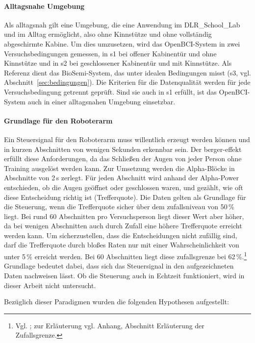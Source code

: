 \paragraph{Alltagsnahe Umgebung} Als alltagsnah gilt eine Umgebung, die eine Anwendung im DLR\_\allowbreak School\_\allowbreak Lab und im Alltag ermöglicht, also ohne Kinnstütze und ohne vollständig abgeschirmte Kabine. Um dies umzusetzen, wird das OpenBCI-System in zwei Versuchsbedingungen gemessen, in s1 bei offener Kabinentür und ohne Kinnstütze und in s2 bei geschlossener Kabinentür und mit Kinnstütze. Als Referenz dient das BioSemi-System, das unter idealen Bedingungen misst (s3, vgl. Abschnitt~\ref{sec:bedingungen}). Die Kriterien für die Datenqualität werden für jede Versuchsbedingung getrennt geprüft. Sind sie auch in s1 erfüllt, ist das OpenBCI-System auch in einer alltagsnahen Umgebung einsetzbar.

\paragraph{Grundlage für den Roboterarm} Ein Steuersignal für den Roboterarm muss willentlich erzeugt werden können und in kurzen Abschnitten von wenigen Sekunden erkennbar sein. Der \gls{berger-effekt} erfüllt diese Anforderungen, da das Schließen der Augen von jeder Person ohne Training ausgelöst werden kann. Zur Umsetzung werden die Alpha-Blöcke in Abschnitte von 2\,s zerlegt. Für jeden Abschnitt wird anhand der Alpha-Power entschieden, ob die Augen geöffnet oder geschlossen waren, und gezählt, wie oft diese Entscheidung richtig ist (Trefferquote). Die Daten gelten als Grundlage für die Steuerung, wenn die Trefferquote sicher über dem \gls{zufallsniveau} von 50\,\% liegt. Bei rund 60 Abschnitten pro Versuchsperson liegt dieser Wert aber höher, da bei wenigen Abschnitten auch durch Zufall eine höhere Trefferquote erreicht werden kann. Um sicherzustellen, dass die Entscheidungen nicht zufällig sind, darf die Trefferquote durch bloßes Raten nur mit einer Wahrscheinlichkeit von unter 5\,\% erreicht werden. Bei 60 Abschnitten liegt diese \gls{zufallsgrenze} bei 62\,\%.\footnote{Vgl. \cite[S.~52--53]{muellerputz2008}; zur Erläuterung vgl. Anhang, Abschnitt \glqq Erläuterung der Zufallsgrenze\grqq{}.} Grundlage bedeutet dabei, dass sich das Steuersignal in den aufgezeichneten Daten nachweisen lässt. Ob die Steuerung auch in Echtzeit funktioniert, wird in dieser Arbeit nicht untersucht.

Bezüglich dieser Paradigmen wurden die folgenden Hypothesen aufgestellt:

